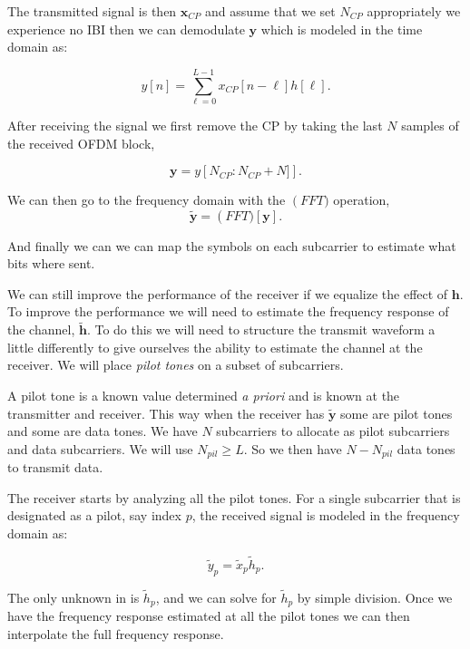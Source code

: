 The transmitted signal is then $\mathbf{x}_{CP}$ and assume that we set $N_{CP}$ appropriately we experience no \ac{IBI} then we can demodulate $\mathbf{y}$ which is modeled in the time domain as:

\begin{equation}
y[n] = \sum_{\ell=0}^{L-1}x_{CP}[n-\ell]h[\ell].
\end{equation}
\noindent

After receiving the signal we first remove the \ac{CP} by taking the last $N$ samples of the received \ac{OFDM} block,

\begin{equation}
\mathbf{y} = y\left[N_{CP}:N_{CP}+N]\right].
\end{equation}
\noindent

We can then go to the frequency domain with the $\operatorname(FFT)$ operation,
\begin{equation}
\label{eq:rxfft}
\tilde{\mathbf{y}} = \operatorname(FFT)\left[\mathbf{y}\right].
\end{equation}
\noindent

And finally we can we can map the symbols on each subcarrier to estimate what bits where sent.

We can still improve the performance of the receiver if we equalize the effect of $\mathbf{h}$. To improve the performance we will need to estimate the frequency response of the channel, $\tilde{\mathbf{h}}$. To do this we will need to structure the transmit waveform a little differently to give ourselves the ability to estimate the channel at the receiver. We will place \emph{pilot tones} on a subset of subcarriers.

A pilot tone is a known value determined \emph{a priori} and is known at the transmitter and receiver. This way when the receiver has $\tilde{\mathbf{y}}$ some are pilot tones and some are data tones. We have $N$ subcarriers to allocate as pilot subcarriers and data subcarriers. We will use $N_{pil} \geq L$. So we then have $N-N_{pil}$ data tones to transmit data.

The receiver starts by analyzing all the pilot tones. For a single subcarrier that is designated as a pilot, say index $p$, the received signal is modeled in the frequency domain as:

\begin{equation}
\label{eq:psubcar}
\tilde{y}_p = \tilde{x}_p\tilde{h}_p.
\end{equation}

\noindent
The only unknown in  is $\tilde{h}_p$, and we can solve for $\tilde{h}_p$ by simple division. Once we have the frequency response estimated at all the pilot tones we can then interpolate the full frequency response.

